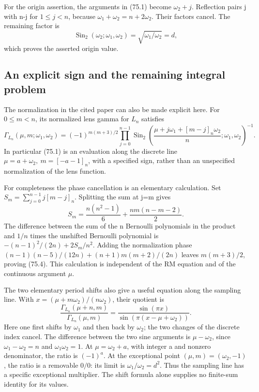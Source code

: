 \documentclass[11pt,reqno]{amsart}
\theoremstyle{plain}
\begin{document}
For the origin assertion, the arguments in (75.1) become
\(\omega_2+j\). Reflection pairs j with n-j for
\(1\le j<n\), because
\(\omega_1+\omega_2=n+2\omega_2\). Their factors cancel.
The remaining factor is
\[
 \operatorname{Sin}_2(\omega_2;\omega_1,\omega_2)
 =\sqrt{\omega_1/\omega_2}=d,
\]
which proves the asserted origin value.\hfill\qedsymbol

\subsection{An explicit sign and the remaining integral problem}\label{sec:75.2}

The normalization in the cited paper can also be made explicit here.
For \(0\le m<n\), its normalized lens gamma for \(L_n\) satisfies
\begin{equation*}
 \Gamma_{L_n}(\mu,m;\omega_1,\omega_2)
 =(-1)^{m(m+3)/2}
 \prod_{j=0}^{n-1}
 \operatorname{Sin}_2\!\left(
 \frac{\mu+j\omega_1+[m-j]_n\omega_2}{n};
 \omega_1,\omega_2\right)^{-1}.
 \tag{75.4}
\end{equation*}
In particular (75.1) is an evaluation along the discrete line
\(\mu=a+\omega_2,\ m=[-a-1]_n\), with a specified sign, rather
than an unspecified normalization of the lens function.

For completeness the phase cancellation is an elementary calculation.
Set \(S_m=\sum_{j=0}^{n-1}j[m-j]_n\). Splitting the sum at j=m gives
\[
 S_m=\frac{n(n^2-1)}6+\frac{nm(n-m-2)}2.
\]
The difference between the sum of the n Bernoulli polynomials in the
product and \(1/n\) times the unshifted Bernoulli polynomial is
\(- (n-1)^2/(2n)+2S_m/n^2\). Adding the normalization phase
\((n-1)(n-5)/(12n)+(n+1)m(m+2)/(2n)\) leaves
\(m(m+3)/2\), proving (75.4). This calculation is independent of
the RM equation and of the continuous argument \(\mu\).

The two elementary period shifts also give a useful equation along the
sampling line. With \(x=(\mu+m\omega_2)/(n\omega_2)\), their quotient
is
\begin{equation*}
 \frac{\Gamma_{L_n}(\mu+n,m)}{\Gamma_{L_n}(\mu,m)}
 =\frac{\sin(\pi x)}{\sin(\pi(x-\mu+\omega_2))}.
 \tag{75.5}
\end{equation*}
Here one first shifts by \(\omega_1\) and then back by \(\omega_2\);
the two changes of the discrete index cancel. The difference between
the two sine arguments is \(\mu-\omega_2\), since
\(\omega_1-\omega_2=n\) and \(\omega_1\omega_2=1\).
At \(\mu=\omega_2+a\), with integer a and nonzero denominator, the
ratio is \((-1)^a\). At the exceptional point
\((\mu,m)=(\omega_2,-1)\), the ratio is a removable \(0/0\): its
limit is \(\omega_1/\omega_2=d^2\). Thus the sampling line has a
specific exceptional multiplier. The shift formula alone supplies no
finite-sum identity for its values.
\end{document}
